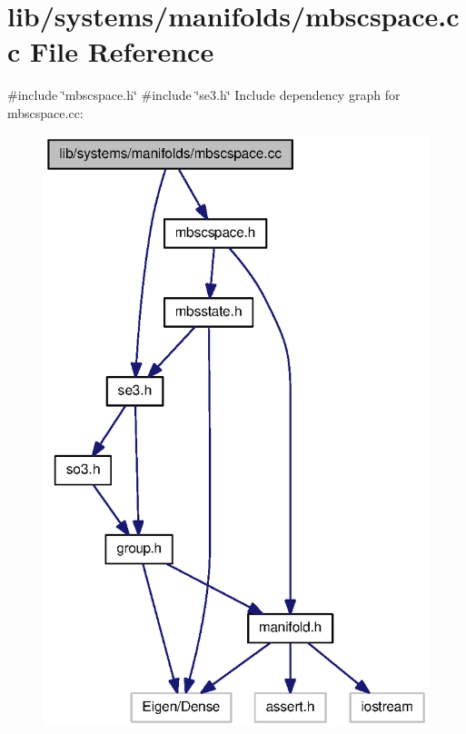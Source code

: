 \section{lib/systems/manifolds/mbscspace.cc \-File \-Reference}
\label{mbscspace_8cc}
{\ttfamily \#include \char`\"{}mbscspace.\-h\char`\"{}}\*
{\ttfamily \#include \char`\"{}se3.\-h\char`\"{}}\*
\-Include dependency graph for mbscspace.\-cc\-:\nopagebreak
\begin{figure}[H]
\begin{center}
\leavevmode
\includegraphics[width=319pt]{mbscspace_8cc__incl}
\end{center}
\end{figure}
